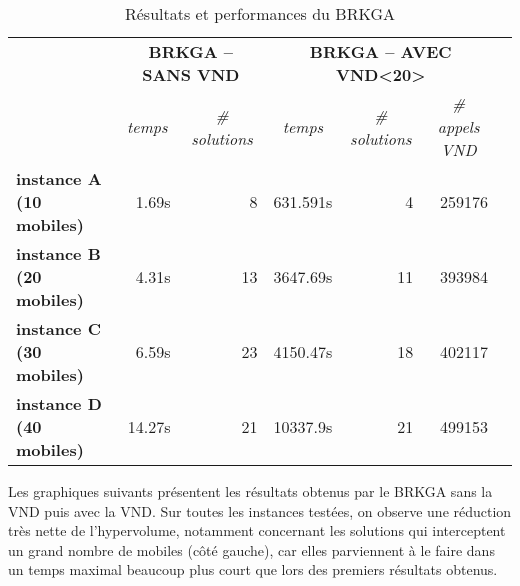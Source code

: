             \begin{table}[H]
                \centering
                \begin{tabular}{r|r|r|r|r|r|l}
                \cline{2-6}
                \multicolumn{1}{l|}{\multirow{2}{*}{}}                 & \multicolumn{2}{c|}{\textbf{BRKGA -- SANS VND}}                                  & \multicolumn{3}{c|}{\textbf{BRKGA -- AVEC VND<20>}}                                                                                &  \\ \cline{2-6}
                \multicolumn{1}{l|}{}                                  & \multicolumn{1}{c|}{\textit{temps}} & \multicolumn{1}{c|}{\textit{\# solutions}} & \multicolumn{1}{c|}{\textit{temps}} & \multicolumn{1}{c|}{\textit{\# solutions}} & \multicolumn{1}{c|}{\textit{\# appels VND}} &  \\ \cline{1-6}
                \multicolumn{1}{|l|}{\textbf{instance A (10 mobiles)}} & 1.69s                               & 8                                         & 631.591s                             & 4                                         & 259176                                      &  \\ \cline{1-6}
                \multicolumn{1}{|l|}{\textbf{instance B (20 mobiles)}} & 4.31s                               & 13                                         & 3647.69s                            & 11                                         & 393984                                      &  \\ \cline{1-6}
                \multicolumn{1}{|l|}{\textbf{instance C (30 mobiles)}} & 6.59s                               & 23                                         & 4150.47s                             & 18                                          & 402117                                      &  \\ \cline{1-6}
                \multicolumn{1}{|l|}{\textbf{instance D (40 mobiles)}} & 14.27s                               & 21                                         & 10337.9s                            & 21                                         & 499153                                      &  \\ \cline{1-6}
                \end{tabular}
                \caption{Résultats et performances du BRKGA}
                \label{tab:brkga}
            \end{table}
            
            Les graphiques suivants présentent les résultats obtenus par le BRKGA sans la VND puis avec la VND. Sur toutes les instances testées, on observe une réduction très nette de l'hypervolume, notamment concernant les solutions qui interceptent un grand nombre de mobiles (côté gauche), car elles parviennent à le faire dans un temps maximal beaucoup plus court que lors des premiers résultats obtenus.
            
